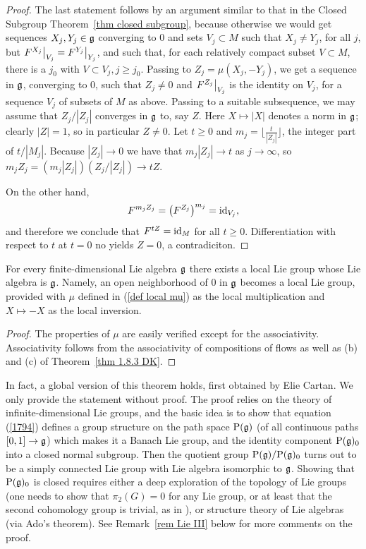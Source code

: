 \begin{proof}
    The last statement follows by an argument similar to that in the Closed Subgroup Theorem~\ref{thm closed subgroup}, because otherwise we would get sequences $X_j,Y_j\in\mathfrak{g}$ converging to $0$ and sets $V_j\subset M$ such that $X_j\neq Y_j$, for all $j$, but $\restr{F^{X_j}}{V_j}=\restr{F^{Y_j}}{Y_j}$, and such that, for each relatively compact subset $V\subset M$, there is a $j_0$ with $V\subset V_j,j\geq j_0$. Passing to $Z_j=\mu(X_j,-Y_j)$, we get a sequence in $\mathfrak{g}$, converging to $0$, such that $Z_j\neq 0$ and $\restr{F^{Z_j}}{V_j}$ is the identity on $V_j$, for a sequence $V_j$ of subsets of $M$ as above. Passing to a suitable subsequence, we may assume that $Z_j/|Z_j|$ converges in $\mathfrak{g}$ to, say $Z$. Here $X\mapsto |X|$ denotes a norm in $\mathfrak{g}$; clearly $|Z|=1$, so in particular $Z\neq 0$. Let $t\geq 0$ and $m_j=\lfloor\frac{t}{|Z_j|}\rfloor$, the integer part of $t/|M_j|$. Because $|Z_j|\to 0$ we have that $m_j|Z_j|\to t$ as $j\to \infty$, so $m_j Z_j=(m_j|Z_j|)(Z_j/|Z_j|)\to tZ$.

    On the other hand,
    \[F^{m_jZ_j}=\left(F^{Z_j}\right)^{m_j}=\operatorname{id}_{V_j},\]
    and therefore we conclude that $F^{tZ}=\operatorname{id}_{M}$ for all $t\geq 0$. Differentiation with respect to $t$ at $t=0$ no yields $Z=0$, a contradiciton.
\end{proof}


\begin{thm}\label{thm local Lie's third}
    For every finite-dimensional Lie algebra $\mathfrak{g}$ there exists a local Lie group whose Lie algebra is $\mathfrak{g}$. Namely, an open neighborhood of $0$ in $\mathfrak{g}$ becomes a local Lie group, provided with $\mu$ defined in (\ref{def local mu}) as the local multiplication and $X\mapsto -X$ as the local inversion.
\end{thm}
\begin{proof}
    The properties of $\mu$ are easily verified except for the associativity. Associativity follows from the associativity of compositions of flows as well as (b) and (c) of Theorem~\ref{thm 1.8.3 DK}.
\end{proof}

In fact, a global version of this theorem holds, first obtained by Elie Cartan. We only provide the statement without proof. The proof relies on the theory of infinite-dimensional Lie groups, and the basic idea is to show that equation (\ref{1794}) defines a group structure on the path space $\mathrm{P}(\mathfrak{g})$ (of all continuous paths $[0,1]\to \mathfrak{g}$) which makes it a Banach Lie group, and the identity component $\mathrm{P}(\mathfrak{g})_0$ into a closed normal subgroup. Then the quotient group $\mathrm{P}(\mathfrak{g})/\mathrm{P}(\mathfrak{g})_0$ turns out to be a simply connected Lie group with Lie algebra isomorphic to $\mathfrak{g}$. Showing that $\mathrm{P}(\mathfrak{g})_0$ is closed requires either a deep exploration of the topology of Lie groups (one needs to show that $\pi_2(G)=0$ for any Lie group, or at least that the second cohomology group is trivial, as in \cite{DK}), or structure theory of Lie algebras (via Ado's theorem). See Remark~\ref{rem Lie III} below for more comments on the proof.

